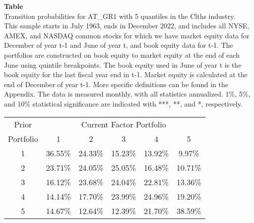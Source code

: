 \begin{table*}[ht!]
\raggedright
{}
\label{tab: transition_probs_AT_GR1_Clths_with_5_quantiles}
\textbf{Table \thetable} \\
Transition probabilities for AT_GR1 with 5 quantiles in the Clths industry. \\
\hspace*{1em}This sample starts in July 1963, ends in December 2022, and includes all NYSE, AMEX, and NASDAQ common stocks for which we have market equity data for December of year t-1 and June of year t, and book equity data for t-1. The portfolios are constructed on book equity to market equity at the end of each June using quintile breakpoints.  The book equity used in June of year t is the book equity for the last fiscal year end in t-1.  Market equity is calculated at the end of December of year t-1.  More specific definitions can be found in the Appendix.  The data is measured monthly, with all statistics annualized.  1\%, 5\%, and 10\% statistical significance are indicated with ***, **, and *, respectively. \\
\vspace{0.5em}
\centering
\begin{adjustbox}{max width=\textwidth}
\begin{tabular}{@{}cccccc@{}}
\toprule
Prior & \multicolumn{5}{c}{Current Factor Portfolio} \\
Portfolio & 1 & 2 & 3 & 4 & 5 \\
\midrule
1 & 36.55\% & 24.33\% & 15.23\% & 13.92\% & 9.97\% \\
2 & 23.71\% & 24.05\% & 25.05\% & 16.48\% & 10.71\% \\
3 & 16.12\% & 23.68\% & 24.04\% & 22.81\% & 13.36\% \\
4 & 14.14\% & 17.70\% & 23.99\% & 24.96\% & 19.20\% \\
5 & 14.67\% & 12.64\% & 12.39\% & 21.70\% & 38.59\% \\
\bottomrule
\end{tabular}
\end{adjustbox}
\end{table*}